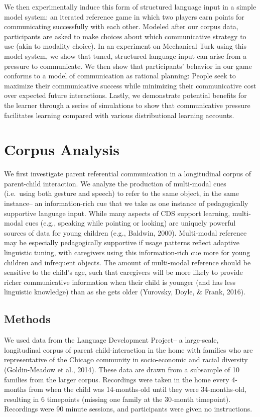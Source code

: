 \documentclass[english,,man,floatsintext]{apa6}
\begin{document}
We then experimentally induce this form of structured language input in a simple model system: an iterated reference game in which two players earn points for communicating successfully with each other. Modeled after our corpus data, participants are asked to make choices about which communicative strategy to use (akin to modality choice). In an experiment on Mechanical Turk using this model system, we show that tuned, structured language input can arise from a pressure to communicate. We then show that participants' behavior in our game conforms to a model of communication as rational planning: People seek to maximize their communicative success while minimizing their communicative cost over expected future interactions. Lastly, we demonstrate potential benefits for the learner through a series of simulations to show that communicative pressure facilitates learning compared with various distributional learning accounts.

\hypertarget{corpus-analysis}{%
\section{Corpus Analysis}\label{corpus-analysis}}

We first investigate parent referential communication in a longitudinal corpus of parent-child interaction. We analyze the production of multi-modal cues (i.e.~using both gesture and speech) to refer to the same object, in the same instance-- an information-rich cue that we take as one instance of pedagogically supportive language input. While many aspects of CDS support learning, multi-modal cues (e.g., speaking while pointing or looking) are uniquely powerful sources of data for young children (e.g., Baldwin, 2000). Multi-modal reference may be especially pedagogically supportive if usage patterns reflect adaptive linguistic tuning, with caregivers using this information-rich cue more for young children and infrequent objects. The amount of multi-modal reference should be sensitive to the child's age, such that caregivers will be more likely to provide richer communicative information when their child is younger (and has less linguistic knowledge) than as she gets older (Yurovsky, Doyle, \& Frank, 2016).

\hypertarget{methods}{%
\subsection{Methods}\label{methods}}

We used data from the Language Development Project-- a large-scale, longitudinal corpus of parent child-interaction in the home with families who are representative of the Chicago community in socio-economic and racial diversity (Goldin-Meadow et al., 2014). These data are drawn from a subsample of 10 families from the larger corpus. Recordings were taken in the home every 4-months from when the child was 14-months-old until they were 34-months-old, resulting in 6 timepoints (missing one family at the 30-month timepoint). Recordings were 90 minute sessions, and participants were given no instructions.
\end{document}
